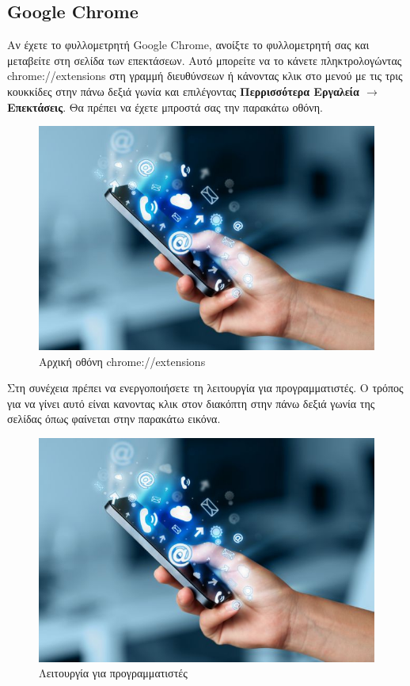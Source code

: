 \documentclass{article}
\begin{document}
\subsection*{Google Chrome}
Αν έχετε το φυλλομετρητή Google Chrome, ανοίξτε το φυλλομετρητή σας και μεταβείτε στη σελίδα των επεκτάσεων. Αυτό μπορείτε να το κάνετε πληκτρολογώντας chrome://extensions στη γραμμή διευθύνσεων ή κάνοντας κλικ στο μενού με τις τρις κουκκίδες στην πάνω δεξιά γωνία και επιλέγοντας \textbf{Περρισσότερα Εργαλεία $\rightarrow$ Επεκτάσεις}. Θα πρέπει να έχετε μπροστά σας την παρακάτω οθόνη.

\begin{figure}[H]
    \includegraphics[width=\textwidth]{logo}
    \caption*{Αρχική οθόνη chrome://extensions}
\end{figure}

Στη συνέχεια πρέπει να ενεργοποιήσετε τη λειτουργία για προγραμματιστές. Ο τρόπος για να γίνει αυτό είναι κανοντας κλικ στον διακόπτη στην πάνω δεξιά γωνία της σελίδας όπως φαίνεται στην παρακάτω εικόνα.
\begin{figure}[H]
    \includegraphics[width=\textwidth]{logo}
    \caption*{Λειτουργία για προγραμματιστές}
\end{figure}
\end{document}
